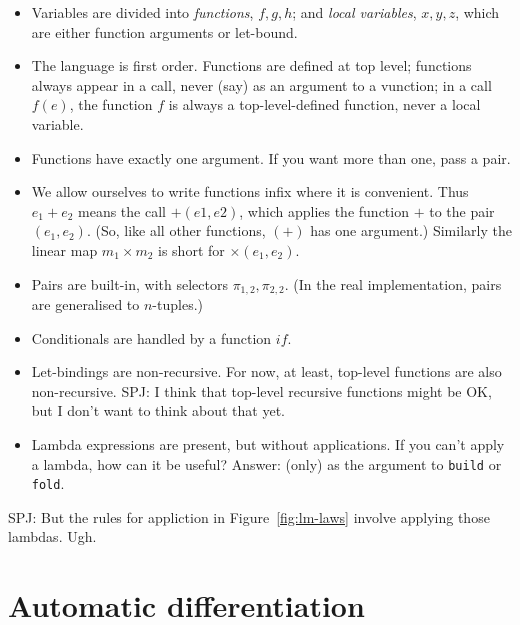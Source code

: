 \documentclass[sigplan,review]{acmart}
\newcommand{\sel}[2]{\pi_{#1,#2}}
\newcommand{\iffun}{\mathit{if}}
\newcommand{\lmpair}{\times}         %
\newcommand{\simon}[1]{{\color{red}SPJ: #1}}
\begin{document}
\begin{itemize}
\item  Variables are divided into \emph{functions}, $f,g,h$; and \emph{local variables}, $x,y,z$,
  which are either function arguments or let-bound.
\item 
  The language is first order.  Functions are defined at top level; functions always appear in a call, never (say) as an argument to a vunction; in a call $f(e)$, the function $f$ is always a top-level-defined function, never a local variable.

\item Functions have exactly one argument. If you want more than one, pass a pair.

\item We allow ourselves to write functions infix where it is convenient.
  Thus $e_1 + e_2$ means the call $+(e1,e2)$, which applies the function $+$ to
  the pair $(e_1,e_2)$.  (So, like all other functions, $(+)$ has one argument.)
  Similarly the linear map $m_1 \lmpair m_2$ is short for $\lmpair(e_1,e_2)$.

\item Pairs are built-in, with selectors $\sel{1}{2}, \sel{2}{2}$.
  (In the real implementation, pairs are generalised to $n$-tuples.)

\item Conditionals are handled by a function $\iffun$.

\item Let-bindings are non-recursive. For now, at least, top-level
  functions are also non-recursive.  \simon{I think that top-level
    recursive functions might be OK, but I don't want to think about
    that yet.}

\item Lambda expressions are present, but without applications.
  If you can't apply a lambda, how can it be useful?  Answer: (only) as the
  argument to \lstinline|build| or \lstinline|fold|.
  \end{itemize}
\simon{But the rules for appliction in Figure~\ref{fig:lm-laws} involve applying those lambdas.  Ugh.}

\section{Automatic differentiation}
\end{document}
